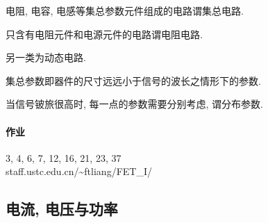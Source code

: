 \documentclass{ctexart}
\begin{document}
\begin{definition}
    电阻, 电容, 电感等集总参数元件组成的电路谓集总电路.
\end{definition}
\begin{definition}
    只含有电阻元件和电源元件的电路谓电阻电路.
\end{definition}
\begin{remark}
    另一类为动态电路.
\end{remark}
\begin{definition}
    集总参数即器件的尺寸远远小于信号的波长之情形下的参数.
\end{definition}
\begin{remark}
    当信号铍旅很高时, 每一点的参数需要分别考虑, 谓分布参数.
\end{remark}
\paragraph{作业} %
\label{par:作业}

3, 4, 6, 7, 12, 16, 21, 23, 37\\
staff.ustc.edu.cn/\textasciitilde ftliang/FET\_I/


\subsection{电流, 电压与功率} %
\label{sub:电流_电压与功率}
\end{document}
